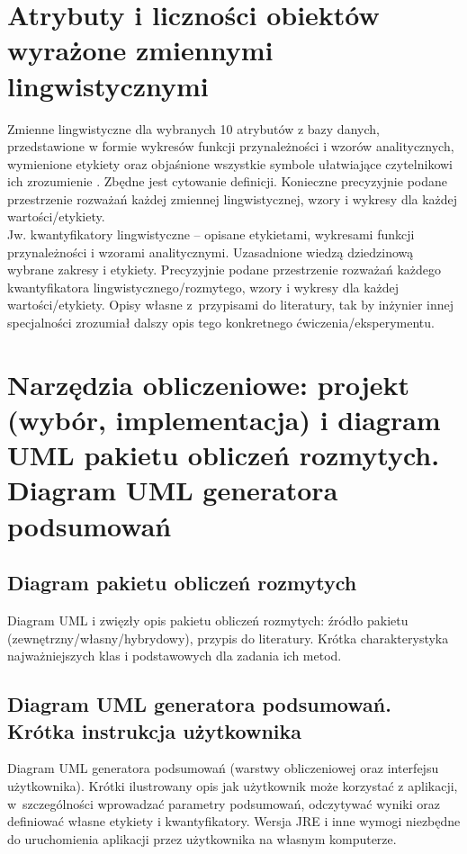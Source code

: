 \documentclass{classrep}
\begin{document}
\section{Atrybuty i liczności obiektów wyrażone zmiennymi lingwistycznymi}
Zmienne lingwistyczne dla wybranych 10 atrybutów z bazy danych, przedstawione w
formie wykresów funkcji przynależności i wzorów analitycznych, wymienione etykiety oraz objaśnione wszystkie
symbole ułatwiające czytelnikowi ich zrozumienie \cite{zadrozny06}. Zbędne jest
cytowanie definicji. Konieczne precyzyjnie podane przestrzenie rozważań każdej
zmiennej lingwistycznej, wzory i wykresy dla każdej wartości/etykiety.\\
Jw. kwantyfikatory lingwistyczne -- opisane etykietami, wykresami funkcji
przynależności i wzorami analitycznymi. Uzasadnione wiedzą dziedzinową wybrane
zakresy i etykiety. Precyzyjnie podane przestrzenie rozważań każdego kwantyfikatora 
lingwistycznego/rozmytego, wzory i wykresy dla każdej wartości/etykiety. Opisy własne z~przypisami do literatury, tak by inżynier innej specjalności zrozumiał dalszy
opis tego konkretnego ćwiczenia/eksperymentu. \\ 

\section{Narzędzia obliczeniowe: projekt (wybór, implementacja) i diagram UML pakietu obliczeń rozmytych. Diagram UML generatora podsumowań}
\subsection{Diagram pakietu obliczeń rozmytych}
Diagram UML i zwięzły opis pakietu obliczeń rozmytych: źródło pakietu
(zewnętrzny/własny/hybrydowy), przypis do literatury. Krótka charakterystyka
najważniejszych klas i podstawowych dla zadania ich metod. \\

\subsection{Diagram UML generatora podsumowań. Krótka instrukcja użytkownika} 
Diagram UML generatora podsumowań (warstwy obliczeniowej oraz interfejsu
użytkownika). Krótki ilustrowany opis jak użytkownik może korzystać z aplikacji, w~szczególności
wprowadzać parametry  podsumowań, odczytywać wyniki oraz definiować własne etykiety i
kwantyfikatory. Wersja JRE i inne wymogi niezbędne do uruchomienia aplikacji przez użytkownika na własnym komputerze. \\
\end{document}
